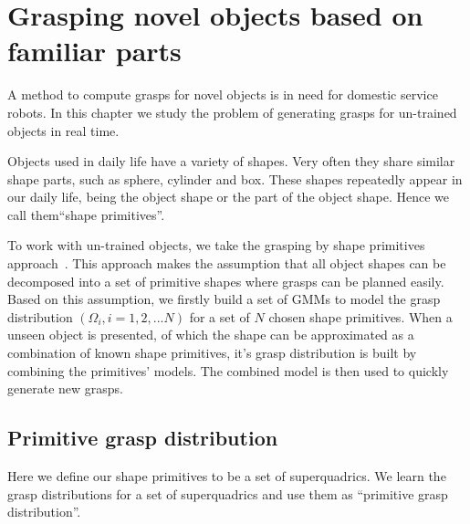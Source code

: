 \section{Grasping novel objects based on familiar parts}
\label{cha3:sec4}
A method to compute grasps for novel objects is in need for domestic service robots. In this chapter we study the problem of generating grasps for un-trained objects in real time.

Objects used in daily life have a variety of shapes. Very often they share similar shape parts, such as sphere, cylinder and box. These shapes repeatedly appear in our daily life, being the object shape or the part of the object shape. Hence we call them``shape primitives''.

To work with un-trained objects, we take the grasping by shape primitives approach~\citep{miller2003automatic}. This approach makes the assumption that all object shapes can be decomposed into a set of primitive shapes where grasps can be planned easily. Based on this assumption, we firstly build a set of GMMs to model the grasp distribution $\left(\Omega_i, i=1,2,...N\right)$ for a set of $N$ chosen shape primitives. When a unseen object is presented, of which the shape can be approximated as a combination of known shape primitives, it's grasp distribution is built by combining the primitives' models. The combined model is then used to quickly generate new grasps.



\subsection{Primitive grasp distribution}
\label{cha3:sec4:pgdistribution}
Here we define our shape primitives to be a set of superquadrics. We learn the grasp distributions for a set of superquadrics and use them as ``primitive grasp distribution''.


